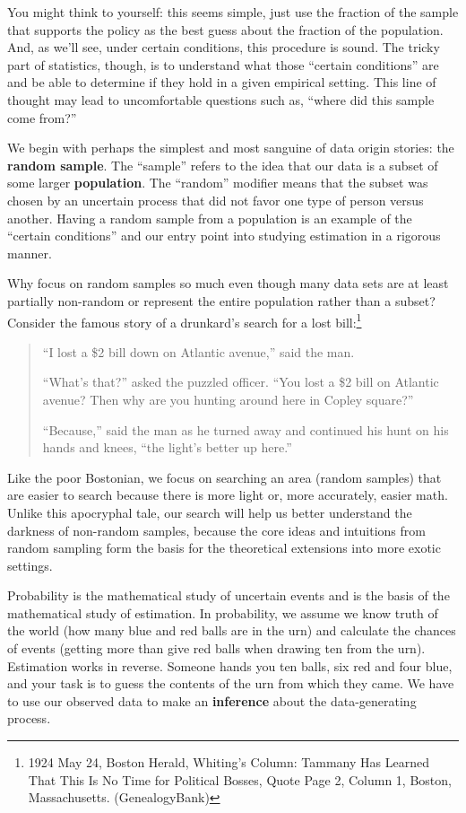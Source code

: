 \documentclass[
  letterpaper,
  DIV=11,
  numbers=noendperiod]{scrreprt}
\theoremstyle{definition}
\theoremstyle{definition}
\theoremstyle{plain}
\theoremstyle{remark}
\begin{document}
You might think to yourself: this seems simple, just use the fraction of
the sample that supports the policy as the best guess about the fraction
of the population. And, as we'll see, under certain conditions, this
procedure is sound. The tricky part of statistics, though, is to
understand what those ``certain conditions'' are and be able to
determine if they hold in a given empirical setting. This line of
thought may lead to uncomfortable questions such as, ``where did this
sample come from?''

We begin with perhaps the simplest and most sanguine of data origin
stories: the \textbf{random sample}. The ``sample'' refers to the idea
that our data is a subset of some larger \textbf{population}. The
``random'' modifier means that the subset was chosen by an uncertain
process that did not favor one type of person versus another. Having a
random sample from a population is an example of the ``certain
conditions'' and our entry point into studying estimation in a rigorous
manner.

Why focus on random samples so much even though many data sets are at
least partially non-random or represent the entire population rather
than a subset? Consider the famous story of a drunkard's search for a
lost bill:\footnote{1924 May 24, Boston Herald, Whiting's Column:
  Tammany Has Learned That This Is No Time for Political Bosses, Quote
  Page 2, Column 1, Boston, Massachusetts. (GenealogyBank)}

\begin{quote}
``I lost a \$2 bill down on Atlantic avenue,'' said the man.

``What's that?'' asked the puzzled officer. ``You lost a \$2 bill on
Atlantic avenue? Then why are you hunting around here in Copley
square?''

``Because,'' said the man as he turned away and continued his hunt on
his hands and knees, ``the light's better up here.''
\end{quote}

Like the poor Bostonian, we focus on searching an area (random samples)
that are easier to search because there is more light or, more
accurately, easier math. Unlike this apocryphal tale, our search will
help us better understand the darkness of non-random samples, because
the core ideas and intuitions from random sampling form the basis for
the theoretical extensions into more exotic settings.

Probability is the mathematical study of uncertain events and is the
basis of the mathematical study of estimation. In probability, we assume
we know truth of the world (how many blue and red balls are in the urn)
and calculate the chances of events (getting more than give red balls
when drawing ten from the urn). Estimation works in reverse. Someone
hands you ten balls, six red and four blue, and your task is to guess
the contents of the urn from which they came. We have to use our
observed data to make an \textbf{inference} about the data-generating
process.
\end{document}
